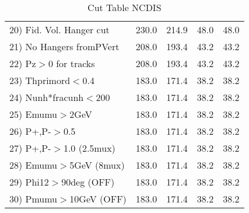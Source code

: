 \begin{table}[h!]
\begin{tabular}{||l||r|r|r|r||}
 20) Fid. Vol. Hanger cut &       230.0 &       214.9 &        48.0 &        48.0 \\
 21) No Hangers fromPVert &       208.0 &       193.4 &        43.2 &        43.2 \\
 22) Pz$>$0 for tracks    &       208.0 &       193.4 &        43.2 &        43.2 \\
 23) Thprimord$<$0.4      &       183.0 &       171.4 &        38.2 &        38.2 \\
 24) Nunh*fracunh$<$200   &       183.0 &       171.4 &        38.2 &        38.2 \\
 25) Emumu$>$2GeV         &       183.0 &       171.4 &        38.2 &        38.2 \\
 26) P+,P-$>$0.5          &       183.0 &       171.4 &        38.2 &        38.2 \\
 27) P+,P-$>$1.0 (2.5mux) &       183.0 &       171.4 &        38.2 &        38.2 \\
 28) Emumu$>$5GeV  (8mux) &       183.0 &       171.4 &        38.2 &        38.2 \\
 29) Phi12$>$90deg  (OFF) &       183.0 &       171.4 &        38.2 &        38.2 \\
 30) Pmumu$>$10GeV  (OFF) &       183.0 &       171.4 &        38.2 &        38.2 \\
 \hline
 \hline
 \end{tabular}
 \caption{Cut Table  NCDIS  }
 \label{tab-cut_ncdis}
 \end{table}
